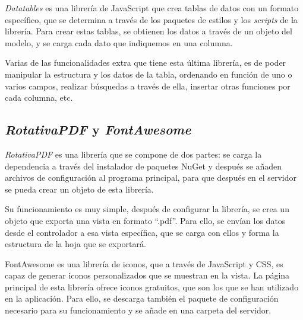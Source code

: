 \emph{Datatables} es una librería de JavaScript que crea tablas de datos con un formato específico, que se determina a través de los paquetes de estilos y los \emph{scripts} de la librería. Para crear estas tablas, se obtienen los datos a través de un objeto del modelo, y se carga cada dato que indiquemos en una columna.

Varias de las funcionalidades extra que tiene esta última librería, es de poder manipular la estructura y los datos de la tabla, ordenando en función de uno o varios campos, realizar búsquedas a través de ella, insertar otras funciones por cada columna, etc.

\subsection{\emph{RotativaPDF} y \emph{FontAwesome}}
\emph{RotativaPDF} es una librería que se compone de dos partes: se carga la dependencia a través del instalador de paquetes NuGet y después se añaden archivos de configuración al programa principal, para que después en el servidor se pueda crear un objeto de esta librería.

Su funcionamiento es muy simple, después de configurar la librería, se crea un objeto que exporta una vista en formato ``.pdf''. Para ello, se envían los datos desde el controlador a esa vista específica, que se carga con ellos y forma la estructura de la hoja que se exportará.

FontAwesome es una librería de iconos, que a través de JavaScript y CSS, es capaz de generar iconos personalizados que se muestran en la vista. La página principal de esta librería ofrece iconos gratuitos, que son los que se han utilizado en la aplicación. Para ello, se descarga también el paquete de configuración necesario para su funcionamiento y se añade en una carpeta del servidor.
